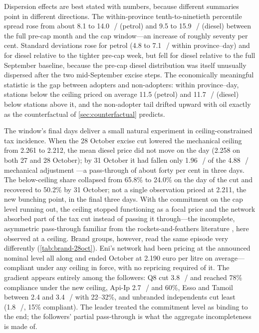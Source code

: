 \documentclass[11pt]{article}
\newcommand{\cl}{\,\text{c}/\text{l}}
\begin{document}
Dispersion effects are best stated with numbers, because different
summaries point in different directions. The within-province
tenth-to-ninetieth percentile spread rose from about 8.1 to 14.0~\cl{}
(petrol) and 9.5 to 15.9~\cl{} (diesel) between the full pre-cap month
and the cap window---an increase of roughly seventy per cent. Standard
deviations rose for petrol (4.8 to 7.1~\cl{} within province--day) and
for diesel relative to the tighter pre-cap week, but fell for diesel
relative to the full September baseline, because the pre-cap diesel
distribution was itself unusually dispersed after the two mid-September
excise steps. The economically meaningful statistic is the gap between
adopters and non-adopters: within province--day, stations below the
ceiling priced on average 11.5 (petrol) and 11.7~\cl{} (diesel) below
stations above it, and the non-adopter tail drifted upward with oil
exactly as the counterfactual of \cref{sec:counterfactual} predicts.

The window's final days deliver a small natural experiment in
ceiling-constrained tax incidence. When the 28 October excise cut
lowered the mechanical ceiling from 2.261 to 2.212, the mean diesel price
did not move on the day (2.258 on both 27 and 28 October); by 31 October
it had fallen only 1.96~\cl{} of the 4.88~\cl{} mechanical adjustment
---a pass-through of about forty per cent in three days. The
below-ceiling share collapsed from 65.8\% to 24.0\% on the day of the
cut and recovered to 50.2\% by 31 October; not a single observation
priced at 2.211, the new bunching point, in the final three days. With
the commitment on the cap level running out, the ceiling stopped
functioning as a focal price and the network absorbed part of the tax
cut instead of passing it through---the incomplete, asymmetric
pass-through familiar from the rockets-and-feathers literature
\parencite{tappata2009, borenstein2002}, here observed at a ceiling.
Brand groups, however, read the same episode very differently
(\cref{tab:brand-28oct}). Eni's network had been pricing at the
announced nominal level all along and ended October at 2.190 euro per
litre on
average---compliant under any ceiling in force, with no repricing
required of it. The gradient appears entirely among the followers:
Q8 cut 3.8~\cl{} and reached 78\% compliance under the new ceiling,
Api-Ip 2.7~\cl{} and 60\%, Esso and Tamoil between 2.4 and 3.4~\cl{}
with 22--32\%, and unbranded independents cut least (1.8~\cl{}, 15\%
compliant). The leader treated the commitment level as binding to the
end; the followers' partial pass-through is what the aggregate
incompleteness is made of.
\end{document}
